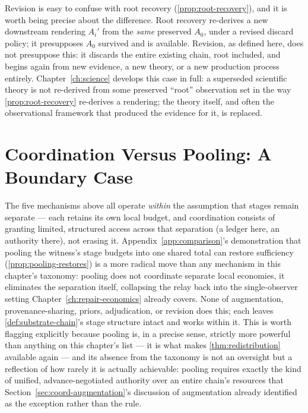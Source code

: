 Revision is easy to confuse with root recovery (\cref{prop:root-recovery}),
and it is worth being precise about the difference. Root recovery
re-derives a new downstream rendering $A_i'$ from the \emph{same}
preserved $A_0$, under a revised discard policy; it presupposes $A_0$
survived and is available. Revision, as defined here, does not presuppose
this: it discards the entire existing chain, root included, and begins
again from new evidence, a new theory, or a new production process
entirely. Chapter~\ref{ch:science} develops this case in full: a
superseded scientific theory is not re-derived from some preserved
``root'' observation set in the way \cref{prop:root-recovery} re-derives
a rendering; the theory itself, and often the observational framework
that produced the evidence for it, is replaced.

\section{Coordination Versus Pooling: A Boundary Case}
\label{sec:coord-vs-pooling}

The five mechanisms above all operate \emph{within} the assumption that
stages remain separate --- each retains its own local budget, and
coordination consists of granting limited, structured access across that
separation (a ledger here, an authority there), not erasing it.
Appendix~\ref{app:comparison}'s demonstration that pooling the witness's
stage budgets into one shared total can restore sufficiency
(\cref{prop:pooling-restores}) is a more radical move than any mechanism
in this chapter's taxonomy: pooling does not coordinate separate local
economies, it eliminates the separation itself, collapsing the relay back
into the single-observer setting Chapter~\ref{ch:repair-economics}
already covers. None of augmentation, provenance-sharing, priors,
adjudication, or revision does this; each leaves
\cref{def:substrate-chain}'s stage structure intact and works within it.
This is worth flagging explicitly because pooling is, in a precise sense,
strictly more powerful than anything on this chapter's list --- it is
what makes \cref{thm:redistribution} available again --- and its absence
from the taxonomy is not an oversight but a reflection of how rarely it
is actually achievable: pooling requires exactly the kind of unified,
advance-negotiated authority over an entire chain's resources that
Section~\ref{sec:coord-augmentation}'s discussion of augmentation already
identified as the exception rather than the rule.

